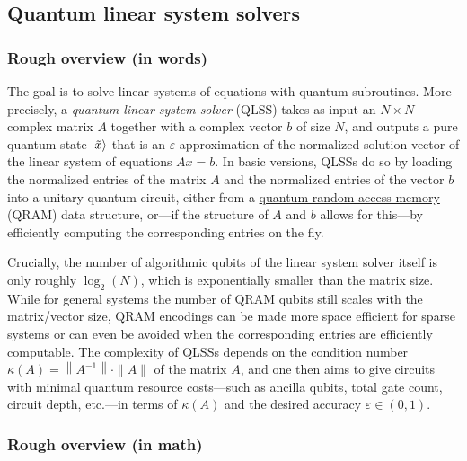 
\begin{refsection}

\section{Quantum linear system solvers}\label{prim:QuantumLinearSystemSolvers}

\subsubsection*{Rough overview (in words)}

The goal is to solve linear systems of equations with quantum subroutines. More precisely, a \emph{quantum linear system solver} (QLSS) takes as input an $N\times N$ complex matrix $A$ together with a complex vector $b$ of size $N$, and outputs a pure quantum state $\lvert\tilde x\rangle$ that is an $\varepsilon$-approximation of the normalized solution vector of the linear system of equations $Ax=b$. In basic versions, QLSSs do so by loading the normalized entries of the matrix $A$ and the normalized entries of the vector $b$ into a unitary quantum circuit, either from a \hyperref[prim:QRAM]{quantum random access memory} (QRAM) data structure, or---if the structure of $A$ and $b$ allows for this---by efficiently computing the corresponding entries on the fly.

Crucially, the number of algorithmic qubits of the linear system solver itself is only roughly $\log_2(N)$, which is exponentially smaller than the matrix size. While for general systems the number of QRAM qubits still scales with the matrix/vector size, QRAM encodings can be made more space efficient for sparse systems or can even be avoided when the corresponding entries are efficiently computable. The complexity of QLSSs depends on the condition number $\kappa(A)=\left\|A^{-1}\right\|\cdot\|A\|$ of the matrix $A$, and one then aims to give circuits with minimal quantum resource costs---such as ancilla qubits, total gate count, circuit depth, etc.---in terms of $\kappa(A)$ and the desired accuracy $\varepsilon\in(0,1)$.


\subsubsection*{Rough overview (in math)}


\end{refsection}
